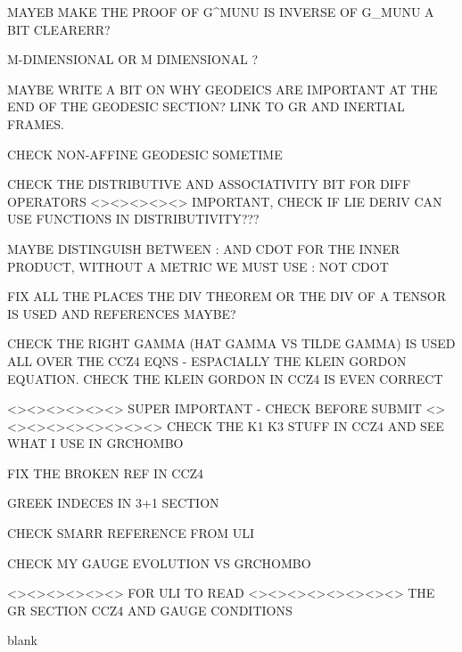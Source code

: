 \documentclass[11pt]{report}  %
\numberwithin{equation}{section}
\begin{document}
MAYEB MAKE THE PROOF OF G^MUNU IS INVERSE OF G_MUNU A BIT CLEARERR?

M-DIMENSIONAL OR M DIMENSIONAL ?

MAYBE WRITE A BIT ON WHY GEODEICS ARE IMPORTANT AT THE END OF THE GEODESIC SECTION? LINK TO GR AND INERTIAL FRAMES.

CHECK NON-AFFINE GEODESIC SOMETIME

CHECK THE DISTRIBUTIVE AND ASSOCIATIVITY BIT FOR DIFF OPERATORS <><><><><> IMPORTANT, CHECK IF LIE DERIV CAN USE FUNCTIONS IN DISTRIBUTIVITY???

MAYBE DISTINGUISH BETWEEN : AND CDOT FOR THE INNER PRODUCT, WITHOUT A METRIC WE MUST USE : NOT CDOT

FIX ALL THE PLACES THE DIV THEOREM OR THE DIV OF A TENSOR IS USED AND REFERENCES MAYBE?

CHECK THE RIGHT GAMMA (HAT GAMMA VS TILDE GAMMA) IS USED ALL OVER THE CCZ4 EQNS - ESPACIALLY THE KLEIN GORDON EQUATION. CHECK THE KLEIN GORDON IN CCZ4 IS EVEN CORRECT

<><><><><><> SUPER IMPORTANT - CHECK BEFORE SUBMIT <><><><><><><><><>
CHECK THE K1 K3 STUFF IN CCZ4 AND SEE WHAT I USE IN GRCHOMBO

FIX THE BROKEN REF IN CCZ4

GREEK INDECES IN 3+1 SECTION

CHECK SMARR REFERENCE FROM ULI

CHECK MY GAUGE EVOLUTION VS GRCHOMBO


<><><><><><> FOR ULI TO READ <><><><><><><><>
THE GR SECTION
CCZ4 AND GAUGE CONDITIONS



\begin{thebibliography}{9}

%
%
% 
% 


blank
  \end{thebibliography}



  
\end{document}
